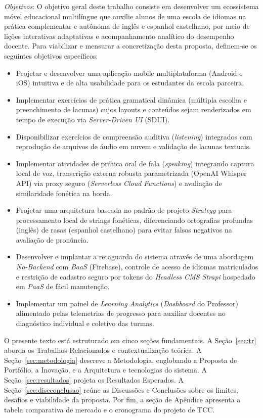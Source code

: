 \documentclass[portuguese]{sbcreviews-2025}%
\begin{document}
\textit{Objetivos}: O objetivo geral deste trabalho consiste em desenvolver um ecossistema móvel educacional multilíngue que auxilie alunos de uma escola de idiomas na prática complementar e autônoma de inglês e espanhol castelhano, por meio de lições interativas adaptativas e acompanhamento analítico do desempenho docente. Para viabilizar e mensurar a concretização desta proposta, definem-se os seguintes objetivos específicos:
\begin{itemize}
    \item Projetar e desenvolver uma aplicação mobile multiplataforma (Android e iOS) intuitiva e de alta usabilidade para os estudantes da escola parceira.
    \item Implementar exercícios de prática gramatical dinâmica (múltipla escolha e preenchimento de lacunas) cujos layouts e conteúdos sejam renderizados em tempo de execução via \textit{Server-Driven UI} (SDUI).
    \item Disponibilizar exercícios de compreensão auditiva (\textit{listening}) integrados com reprodução de arquivos de áudio em nuvem e validação de lacunas textuais.
    \item Implementar atividades de prática oral de fala (\textit{speaking}) integrando captura local de voz, transcrição externa robusta parametrizada (OpenAI Whisper API) via proxy seguro (\textit{Serverless Cloud Functions}) e avaliação de similaridade fonética na borda.
    \item Projetar uma arquitetura baseada no padrão de projeto \textit{Strategy} para processamento local de strings fonéticas, diferenciando ortografias profundas (inglês) de rasas (espanhol castelhano) para evitar falsos negativos na avaliação de pronúncia.
    \item Desenvolver e implantar a retaguarda do sistema através de uma abordagem \textit{No-Backend} com \textit{BaaS} (Firebase), controle de acesso de idiomas matriculados e restrição de cadastro seguro por tokens do \textit{Headless CMS Strapi} hospedado em \textit{PaaS} de fácil manutenção.
    \item Implementar um painel de \textit{Learning Analytics} (\textit{Dashboard} do Professor) alimentado pelas telemetrias de progresso para auxiliar docentes no diagnóstico individual e coletivo das turmas.
\end{itemize}

O presente texto está estruturado em cinco seções fundamentais. A Seção~\ref{sec:tr} aborda os Trabalhos Relacionados e contextualização teórica. A Seção~\ref{sec:metodologia} descreve a Metodologia, englobando a Proposta de Portfólio, a Inovação, e a Arquitetura e tecnologias do sistema. A Seção~\ref{sec:resultados} projeta os Resultados Esperados. A Seção~\ref{sec:discconclusao} reúne as Discussões e Conclusões sobre os limites, desafios e viabilidade da proposta. Por fim, a seção de Apêndice apresenta a tabela comparativa de mercado e o cronograma do projeto de TCC.
\end{document}
